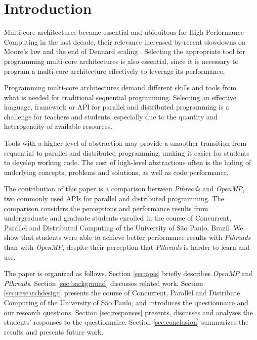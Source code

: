 \section{Introduction}
\label{sec:introduction}

Multi-core architectures became essential and ubiquitous for High-Performance
Computing in the last decade, their relevance increased by recent slowdowns on
Moore's law and the end of Dennard scaling \cite{esmaeilzadeh2012dark}.
Selecting the appropriate tool for programming multi-core architectures is also
essential, since it is necessary to program a multi-core architecture
effectively to leverage its performance.

Programming multi-core architectures demand different skills and tools from
what is needed for traditional sequential programming. Selecting an effective
language, framework or API for parallel and distributed programming is a
challenge for teachers and students, especially due to the quantity and
heterogeneity of available resources.

Tools with a higher level of abstraction may provide a smoother transition from
sequential to parallel and distributed programming, making it easier for
students to develop working code. The cost of high-level abstractions often is
the hiding of underlying concepts, problems and solutions, as well as code
performance.

The contribution of this paper is a comparison between \textit{Pthreads} and
\textit{OpenMP}, two commonly used APIs for parallel and distributed
programming. The comparison considers the perceptions and performance results
from undergraduate and graduate students enrolled in the course of Concurrent,
Parallel and Distributed Computing of the University of São Paulo, Brazil.  We
show that students were able to achieve better performance results with
\textit{Pthreads} than with \textit{OpenMP}, despite their perception that
\textit{Pthreads} is harder to learn and use.

The paper is organized as follows.  Section \ref{sec:apis} briefly describes
\textit{OpenMP} and \textit{Pthreads}.  Section \ref{sec:background} discusses
related work.  Section \ref{sec:researchdesign} presents the course of
Concurrent, Parallel and Distribute Computing of the University of São Paulo,
and introduces the questionnaire and our research questions.  Section
\ref{sec:responses} presents, discusses and analyses the students' responses to
the questionnaire.  Section \ref{sec:conclusion} summarizes the results and
presents future work.
